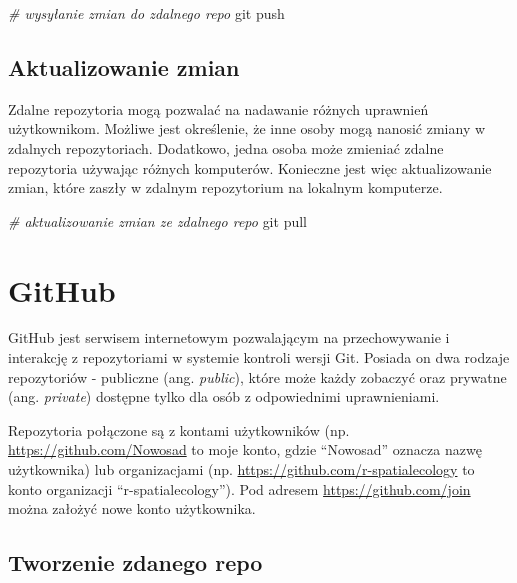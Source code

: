 \documentclass[paper=6in:9in,pagesize=pdftex,headinclude=on,footinclude=on,10pt]{scrbook}
\newenvironment{Shaded}{\begin{snugshade}}{\end{snugshade}}
\newcommand{\CommentTok}[1]{\textcolor[rgb]{0.56,0.35,0.01}{\textit{#1}}}
\newcommand{\FunctionTok}[1]{\textcolor[rgb]{0.00,0.00,0.00}{#1}}
\newcommand{\NormalTok}[1]{#1}
\begin{document}
\begin{Shaded}
\begin{Highlighting}[]
\CommentTok{# wysyłanie zmian do zdalnego repo}
\FunctionTok{git}\NormalTok{ push}
\end{Highlighting}
\end{Shaded}

\hypertarget{aktualizowanie-zmian}{%
\subsection{Aktualizowanie zmian}\label{aktualizowanie-zmian}}

Zdalne repozytoria mogą pozwalać na nadawanie różnych uprawnień użytkownikom.
Możliwe jest określenie, że inne osoby mogą nanosić zmiany w zdalnych repozytoriach.
Dodatkowo, jedna osoba może zmieniać zdalne repozytoria używając różnych komputerów.
Konieczne jest więc aktualizowanie zmian, które zaszły w zdalnym repozytorium na lokalnym komputerze.

\begin{Shaded}
\begin{Highlighting}[]
\CommentTok{# aktualizowanie zmian ze zdalnego repo}
\FunctionTok{git}\NormalTok{ pull}
\end{Highlighting}
\end{Shaded}

\hypertarget{github}{%
\section{GitHub}\label{github}}

GitHub jest serwisem internetowym pozwalającym na przechowywanie i interakcję z repozytoriami w systemie kontroli wersji Git.
Posiada on dwa rodzaje repozytoriów - publiczne (ang. \emph{public}), które może każdy zobaczyć oraz prywatne (ang. \emph{private}) dostępne tylko dla osób z odpowiednimi uprawnieniami.

Repozytoria połączone są z kontami użytkowników (np. \url{https://github.com/Nowosad} to moje konto, gdzie ``Nowosad'' oznacza nazwę użytkownika) lub organizacjami (np. \url{https://github.com/r-spatialecology} to konto organizacji ``r-spatialecology'').
Pod adresem \url{https://github.com/join} można założyć nowe konto użytkownika.

\hypertarget{tworzenie-zdanego-repo}{%
\subsection{Tworzenie zdanego repo}\label{tworzenie-zdanego-repo}}
\end{document}
